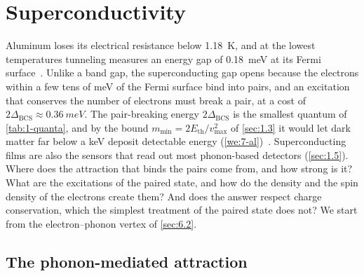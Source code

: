 \section{Superconductivity}\label{sec:7.2}

Aluminum loses its electrical resistance below \SI{1.18}{K}, and at the lowest temperatures tunneling measures an energy gap of \SI{0.18}{meV} at its Fermi surface~\cite[Table~III]{savrasov1996electron}. Unlike a band gap, the superconducting gap opens because the electrons within a few tens of meV of the Fermi surface bind into pairs, and an excitation that conserves the number of electrons must break a pair, at a cost of $2\Delta_{\mathrm{BCS}} \approx \SI{0.36}{meV}$. The pair-breaking energy $2\Delta_{\mathrm{BCS}}$ is the smallest quantum of \cref{tab:1-quanta}, and by the bound $m_{\mathrm{min}} = 2E_{\mathrm{th}}/v_{\mathrm{max}}^2$ of \cref{sec:1.3} it would let dark matter far below a keV deposit detectable energy (\cref{we:7-al})~\cite{hochberg2016detecting}. Superconducting films are also the sensors that read out most phonon-based detectors (\cref{sec:1.5}). Where does the attraction that binds the pairs come from, and how strong is it? What are the excitations of the paired state, and how do the density and the spin density of the electrons create them? And does the answer respect charge conservation, which the simplest treatment of the paired state does not? We start from the electron--phonon vertex of \cref{sec:6.2}.

\subsection{The phonon-mediated attraction}

